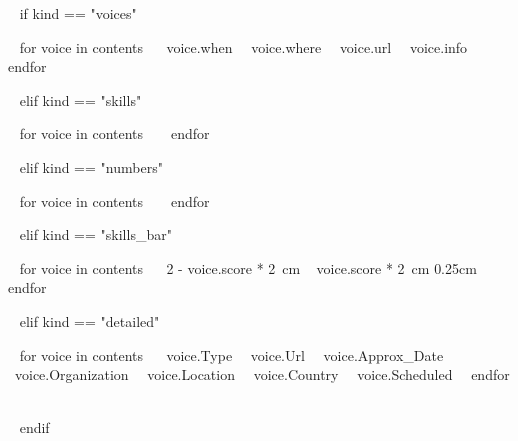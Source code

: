 
~{ if kind == "voices" }~


    ~{ for voice in contents }~
        {~{{voice.when}}~}
        {~{{voice.where}}~}
        {~{{voice.url}}~}       
        {~{{voice.info}}~}~{ endfor }~

        
~{ elif kind == "skills" }~

    
    ~{ for voice in contents }~
    ~{ endfor }~

~{ elif kind == "numbers" }~

    
    ~{ for voice in contents }~
    ~{ endfor }~    

~{ elif kind == "skills_bar" }~

    
    ~{ for voice in contents }~
    {~{{2 - voice.score * 2}}~cm}
    {~{{    voice.score * 2}}~cm}
    {0.25cm}~{ endfor }~

~{ elif kind == "detailed" }~


    ~{ for voice in contents }~
        {~{{voice.Type}}~}
        {~{{voice.Url}}~}
        {~{{voice.Approx_Date}}~}
        {~{{voice.Organization}}~}
        {~{{voice.Location}}~}
        {~{{voice.Country}}~}
        {~{{voice.Scheduled}}~}~{ endfor }~


~{ endif }~


